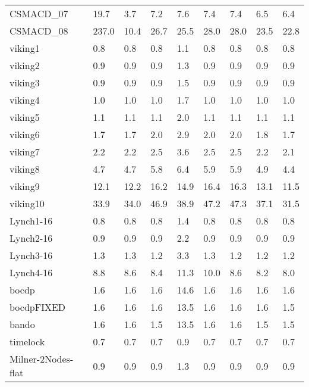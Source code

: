 \begin{table}
\begin{adjustbox}{max totalheight=\textheight}
\begin{tabular}{|l|ll|llllll|}
    CSMACD\_07         & 19.7  & 3.7    & 7.2  & 7.6  & 7.4  & 7.4  & 6.5   & 6.4   \\
    CSMACD\_08         & 237.0 & 10.4   & 26.7 & 25.5 & 28.0 & 28.0 & 23.5  & 22.8  \\ \hline
    viking1            & 0.8   & 0.8    & 0.8  & 1.1  & 0.8  & 0.8  & 0.8   & 0.8   \\
    viking2            & 0.9   & 0.9    & 0.9  & 1.3  & 0.9  & 0.9  & 0.9   & 0.9   \\
    viking3            & 0.9   & 0.9    & 0.9  & 1.5  & 0.9  & 0.9  & 0.9   & 0.9   \\
    viking4            & 1.0   & 1.0    & 1.0  & 1.7  & 1.0  & 1.0  & 1.0   & 1.0   \\
    viking5            & 1.1   & 1.1    & 1.1  & 2.0  & 1.1  & 1.1  & 1.1   & 1.1   \\
    viking6            & 1.7   & 1.7    & 2.0  & 2.9  & 2.0  & 2.0  & 1.8   & 1.7   \\
    viking7            & 2.2   & 2.2    & 2.5  & 3.6  & 2.5  & 2.5  & 2.2   & 2.1   \\
    viking8            & 4.7   & 4.7    & 5.8  & 6.4  & 5.9  & 5.9  & 4.9   & 4.4   \\
    viking9            & 12.1  & 12.2   & 16.2 & 14.9 & 16.4 & 16.3 & 13.1  & 11.5  \\
    viking10           & 33.9  & 34.0   & 46.9 & 38.9 & 47.2 & 47.3 & 37.1  & 31.5  \\ \hline
    Lynch1-16          & 0.8   & 0.8    & 0.8  & 1.4  & 0.8  & 0.8  & 0.8   & 0.8   \\
    Lynch2-16          & 0.9   & 0.9    & 0.9  & 2.2  & 0.9  & 0.9  & 0.9   & 0.9   \\
    Lynch3-16          & 1.3   & 1.3    & 1.2  & 3.3  & 1.3  & 1.2  & 1.2   & 1.2   \\
    Lynch4-16          & 8.8   & 8.6    & 8.4  & 11.3 & 10.0 & 8.6  & 8.2   & 8.0   \\ \hline
    bocdp              & 1.6   & 1.6    & 1.6  & 14.6 & 1.6  & 1.6  & 1.6   & 1.6   \\
    bocdpFIXED         & 1.6   & 1.6    & 1.6  & 13.5 & 1.6  & 1.6  & 1.6   & 1.5   \\
    bando              & 1.6   & 1.6    & 1.5  & 13.5 & 1.6  & 1.6  & 1.5   & 1.5   \\
    timelock           & 0.7   & 0.7    & 0.7  & 0.9  & 0.7  & 0.7  & 0.7   & 0.7   \\ \hline
    Milner-2Nodes-flat & 0.9   & 0.9    & 0.9  & 1.3  & 0.9  & 0.9  & 0.9   & 0.9   \\

\end{tabular}
\end{adjustbox}
\end{table}
